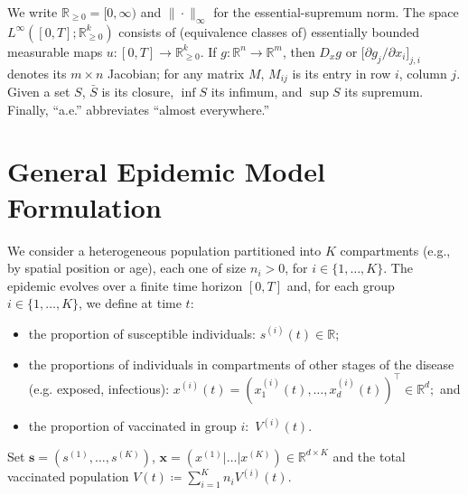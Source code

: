 \documentclass[letterpaper, 10 pt, conference]{ieeeconf}
\newcommand{\R}{\mathbb{R}}
\newcommand{\fori}[1]{#1 \in \{1,\dots, K\}}
\begin{document}
 We write $\R_{\ge0}=[0,\infty)$ and $\|\cdot\|_{\infty}$ for the essential-supremum norm.  
The space $L^\infty([0,T];\R^k_{\ge0})$ consists of (equivalence classes of) essentially bounded measurable maps $u:[0,T]\to\R^k_{\ge0}$.  
If $g:\R^n\to\R^m$, then $D_x g$ or $\bigl[\partial g_j/\partial x_i\bigr]_{j,i}$ denotes its $m\times n$ Jacobian; for any matrix $M$, $M_{ij}$ is its entry in row $i$, column $j$.  
Given a set $S$, $\bar S$ is its closure, $\inf S$ its infimum, and $\sup S$ its supremum.  
Finally, ``a.e.'' abbreviates ``almost everywhere.''

\section{General Epidemic Model Formulation}
\label{sec:modeling}

We consider a heterogeneous population partitioned into $K$ compartments (e.g., by spatial position or age), each one of size $n_i > 0$, for $\fori{i}$.
The epidemic evolves over a finite time horizon $[0, T]$ and, for each group $\fori{i}$, we define at time $t$:
\begin{itemize}
    \item the proportion of susceptible individuals: $s^{(i)}(t) \in \mathbb{R}$;
    \item the proportions of individuals in compartments of other stages of the disease (e.g. exposed, infectious): $x^{(i)}(t) = (x_1^{(i)}(t),\dots, x_d^{(i)}(t))^\top \in \mathbb{R}^d;$ and
    \item the proportion of vaccinated in group $i:$ $V^{(i)}(t).$
\end{itemize}
Set $\boldsymbol{s} = (s^{(1)}, \dots, s^{(K)})$, $\boldsymbol{x} = (x^{(1)} | \dots | x^{(K)}) \in \mathbb{R}^{d\times K}$ and the total vaccinated population $V(t) \coloneqq \sum_{i=1}^{K} n_i V^{(i)}(t)$.
\end{document}
